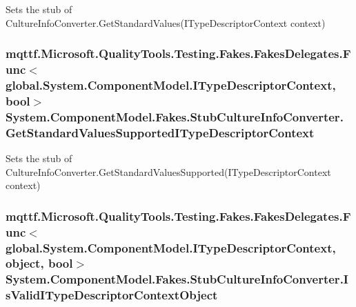 Sets the stub of Culture\-Info\-Converter.\-Get\-Standard\-Values(\-I\-Type\-Descriptor\-Context context)

\hypertarget{class_system_1_1_component_model_1_1_fakes_1_1_stub_culture_info_converter_a067c297471a53314a531276698abf410}{
\subsubsection[{Get\-Standard\-Values\-Supported\-I\-Type\-Descriptor\-Context}]{\setlength{\rightskip}{0pt plus 5cm}mqttf.\-Microsoft.\-Quality\-Tools.\-Testing.\-Fakes.\-Fakes\-Delegates.\-Func$<$global.\-System.\-Component\-Model.\-I\-Type\-Descriptor\-Context, bool$>$ System.\-Component\-Model.\-Fakes.\-Stub\-Culture\-Info\-Converter.\-Get\-Standard\-Values\-Supported\-I\-Type\-Descriptor\-Context}}\label{class_system_1_1_component_model_1_1_fakes_1_1_stub_culture_info_converter_a067c297471a53314a531276698abf410}


Sets the stub of Culture\-Info\-Converter.\-Get\-Standard\-Values\-Supported(\-I\-Type\-Descriptor\-Context context)

\hypertarget{class_system_1_1_component_model_1_1_fakes_1_1_stub_culture_info_converter_aac4712e1bdec432d586a5888700b3d3b}{
\subsubsection[{Is\-Valid\-I\-Type\-Descriptor\-Context\-Object}]{\setlength{\rightskip}{0pt plus 5cm}mqttf.\-Microsoft.\-Quality\-Tools.\-Testing.\-Fakes.\-Fakes\-Delegates.\-Func$<$global.\-System.\-Component\-Model.\-I\-Type\-Descriptor\-Context, object, bool$>$ System.\-Component\-Model.\-Fakes.\-Stub\-Culture\-Info\-Converter.\-Is\-Valid\-I\-Type\-Descriptor\-Context\-Object}}\label{class_system_1_1_component_model_1_1_fakes_1_1_stub_culture_info_converter_aac4712e1bdec432d586a5888700b3d3b}


